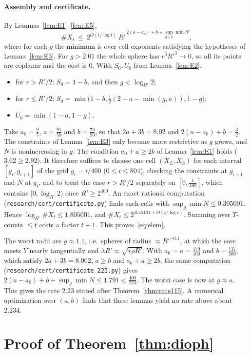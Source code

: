 \documentclass[aps,prx,twocolumn,superscriptaddress,nofootinbib,longbibliography]{revtex4-2}
\theoremstyle{plain}
\theoremstyle{definition}
\theoremstyle{remark}
\begin{document}
\paragraph{Assembly and certificate.} By Lemmas~\ref{lem:E1}--\ref{lem:E5},
\[
\#X_t\ \le\ 2^{O(t/\log t)}\,R'^{\,2(a-a_0)+b+\sup_{g\ge0}\min N},
\]
where for each $g$ the minimum is over cell exponents satisfying the hypotheses of Lemma~\ref{lem:E3}. For $g>2.01$ the whole sphere has $r^3R'^3\to0$, so all its points are coplanar and the cost is $0$. With $S_0,U_0$ from Lemma~\ref{lem:E2},
\begin{itemize}\setlength\itemsep{0pt}
\item for $r>R'/2$: $S_0=1-b$, and then $g<\log_{R'}2$;
\item for $r\le R'/2$: $S_0=\min\big(1-b,\tfrac12(2-a-\min(g,a)),1-g\big)$;
\item $U_0=\min(1-a,1-g)$.
\end{itemize}
Take $a_0=\tfrac95$, $a=\tfrac{91}{50}$ and $b=\tfrac{73}{50}$, so that $2a+3b=8.02$ and $2(a-a_0)+b=\tfrac32$. The constraints of Lemma~\ref{lem:E3} only become more restrictive as $g$ grows, and $N$ is nonincreasing in $g$. The condition $a_0+a\ge2b$ of Lemma~\ref{lem:E1} holds ($3.62\ge2.92$). It therefore suffices to choose one cell $(X_L,X_S)$ for each interval $[g_i,g_{i+1}]$ of the grid $g_i=i/400$ ($0\le i\le804$), checking the constraints at $g_{i+1}$ and $N$ at $g_i$, and to treat the case $r>R'/2$ separately on $[0,\tfrac1{400}]$, which contains $[0,\log_{R'}2)$ once $R'\ge2^{400}$. An exact rational computation (\texttt{research/cert/certificate.py}) finds such cells with $\sup_g\min N\le0.305001$. Hence $\log_{R'}\#X_t\le1.805001$, and $\#X_t\le2^{\,0.4513\,t+O(t/\log t)}$. Summing over $T$-counts $\le t$ costs a factor $t+1$. This proves~\eqref{eq:elem}.

The worst radii are $g\approx1.1$, i.e.\ spheres of radius $\approx R'^{-0.1}$, at which the core meets $Y$ nearly tangentially and $\lambda R'\approx\sqrt{r\rho R'}$. With $a_0=a=\tfrac{179}{100}$ and $b=\tfrac{737}{500}$, which satisfy $2a+3b=8.002$, $a\ge b$ and $a_0+a\ge2b$, the same computation (\texttt{research/cert/certificate\_223.py}) gives $2(a-a_0)+b+\sup_g\min N\le1.791<\tfrac{400}{223}$. The worst case is now at $g\approx a$. This gives the rate $2.23$ stated after Theorem~\ref{thm:rate115}. A numerical optimization over $(a,b)$ finds that these lemmas yield no rate above about $2.234$.

\section{Proof of Theorem~\ref{thm:dioph}}\label{app:dioph}
\end{document}
